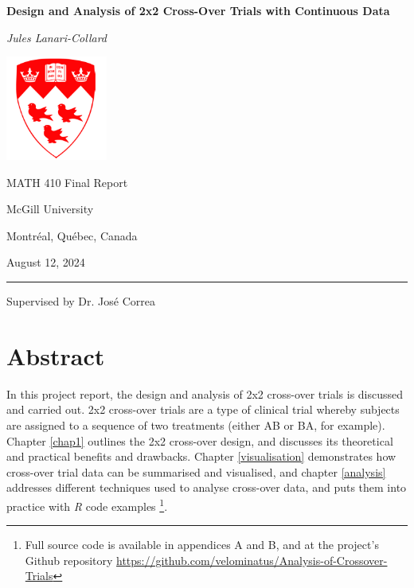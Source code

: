 \documentclass[12pt, TexShade, letterpaper]{report}
\begin{document}
\begin{titlepage}
		\begin{center}
			\vspace*{0.5cm}

			\LARGE
			\textbf{Design and Analysis of 2x2 Cross-Over Trials with Continuous Data}
			
			\vspace{1cm}
			
			\textit{Jules Lanari-Collard}
			
			\vspace{1.2cm}
			
			\includegraphics[width=0.25\textwidth]{report/mcglogo.png}
			
			\Large
			MATH 410 Final Report
			
			\vspace{-5mm}
			McGill University
			
			\vspace{-5mm}
			Montr\'eal, Qu\'ebec, Canada
			
			\vspace{5mm}
			August 12, 2024
			\small
			\vspace{0.5cm}
			{\color{red} \hrule height 0.75mm}
			
			\vspace{0.2cm}
			
			Supervised by Dr. José Correa
		\end{center}
\end{titlepage}

\setlength{\voffset}{2cm}
\renewcommand{\chaptermark}[1]{%
	\markboth{\thechapter.\ #1}{}}
\chapter*{Abstract}
	\label{chap:engAbstract}

In this project report, the design and analysis of 2x2 cross-over trials is discussed and carried out. 2x2 cross-over trials are a type of clinical trial whereby subjects are assigned to a sequence of two treatments (either AB or BA, for example).  Chapter \ref{chap1} outlines the 2x2 cross-over design, and discusses its theoretical and practical benefits and drawbacks. Chapter \ref{visualisation} demonstrates how cross-over trial data can be summarised and visualised, and chapter \ref{analysis} addresses different techniques used to analyse cross-over data, and puts them into practice with \textit{R} code examples \footnote{Full source code is available in appendices A and B, and at the project's Github repository \url{https://github.com/velominatus/Analysis-of-Crossover-Trials}}.
\end{document}
